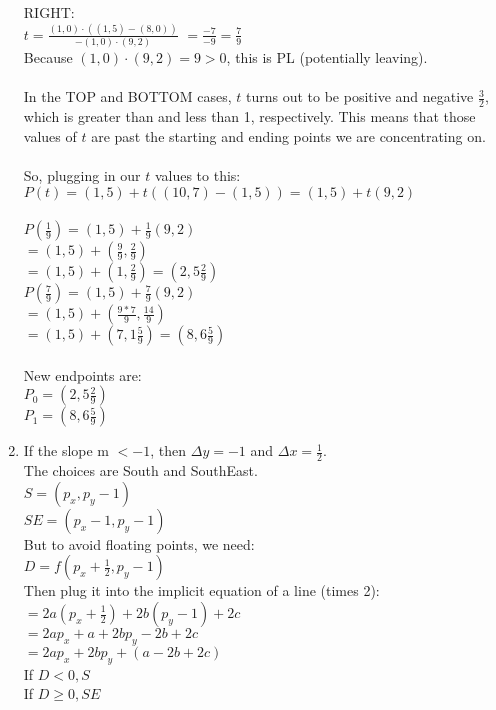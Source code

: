 \documentclass[12pt]{article}
\begin{document}
\begin{enumerate}
RIGHT: \\
$t = \frac{(1, 0) \cdot ((1, 5) - (8, 0))}{-(1, 0) \cdot (9, 2)}$
$ = \frac{-7}{-9} = \frac{7}{9}$ \\
Because $(1, 0) \cdot (9, 2) = 9 > 0$, this is PL (potentially leaving). \\ \\

In the TOP and BOTTOM cases, $t$ turns out to be positive and negative $\frac{3}{2}$, which is greater than and less than 1, respectively. This means that those values of $t$ are past the starting and ending points we are concentrating on. \\ \\

So, plugging in our $t$ values to this: \\
$P(t)= (1, 5) + t((10, 7) - (1, 5)) = (1, 5) + t(9, 2)$ \\ \\
$P(\frac{1}{9}) = (1, 5) + \frac{1}{9}(9, 2)$ \\
$ = (1, 5) + (\frac{9}{9}, \frac{2}{9})$ \\
$ = (1, 5) + (1, \frac{2}{9}) = (2, 5\frac{2}{9})$ \\

$P(\frac{7}{9}) = (1, 5) + \frac{7}{9}(9, 2)$ \\
$ = (1, 5) + (\frac{9*7}{9}, \frac{14}{9})$ \\
$ = (1, 5) + (7, 1\frac{5}{9}) = (8, 6\frac{5}{9})$ \\ \\

New endpoints are: \\
$P_0 = (2, 5\frac{2}{9})$ \\
$P_1 = (8, 6\frac{5}{9})$ 

\item
If the slope m $< -1$, then $\Delta y = -1$ and $\Delta x = \frac{1}{2}.$ \\
The choices are South and SouthEast. \\
$S = (p_x, p_y -1)$ \\
$SE = (p_x -1, p_y -1)$ \\
But to avoid floating points, we need: \\
$D = f(p_x+\frac{1}{2}, p_y - 1)$ \\
Then plug it into the implicit equation of a line (times 2): \\
$ = 2a(p_x+\frac{1}{2}) + 2b(p_y - 1) + 2c$ \\
$ = 2ap_x + a + 2bp_y - 2b + 2c$ \\
$ = 2ap_x + 2bp_y + (a - 2b + 2c)$ \\ 
If $D < 0, S$ \\
If $D \geq 0, SE$ \\ \\


\end{enumerate}
\end{document}
